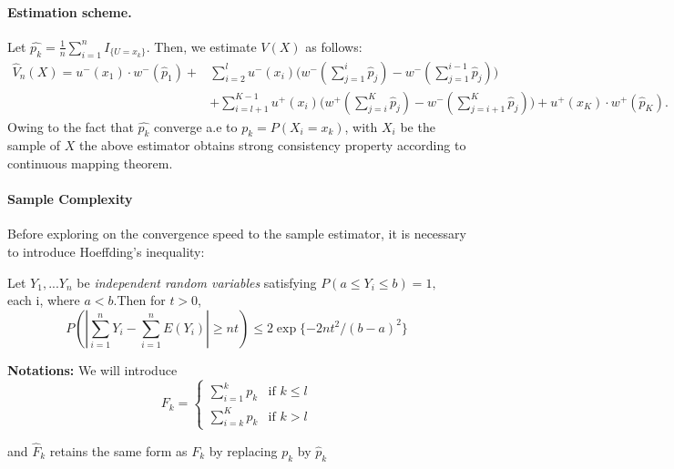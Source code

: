 \paragraph{Estimation scheme.} 
Let $\hat{p_k}= \frac{1}{n} \sum_{i=1}^n I_{\{U =x_k\}}$. Then, we estimate $V(X)$ as follows:
\begin{align}
 \label{eq:cpt-discrete-est}
\hat V_n(X) = 
u^-(x_1)\cdot w^-(\hat p_1)+
& \sum_{i=2}^l u^-(x_i) \Big(w^-(\sum_{j=1}^i \hat p_j) - w^-(\sum_{j=1}^{i-1} \hat p_j)\Big) 
\\
&
+ \sum_{i=l+1}^{K-1} u^+(x_i) \Big(w^+(\sum_{j=i}^K \hat p_j) - w^-(\sum_{j=i+1}^K \hat p_j) \Big)+ u^+(x_K)\cdot w^+(\hat p_K).
\end{align}
Owing to the fact that $\hat{p_k}$ converge a.e to $p_k=P(X_i=x_k)$, with $X_i$ be the sample of $X$ the above estimator obtains strong consistency property according to continuous mapping theorem. 

\paragraph{Sample Complexity}
Before exploring on the convergence speed to the sample estimator, it is necessary to introduce Hoeffding's inequality:
\begin{lemma}
Let $Y_1,...Y_n$ be \emph{independent random variables} satisfying $P(a\leq Y_i \leq b)= 1,$ each i, where $a<b.
$Then for $t>0$,
$$P(\left|\sum_{i=1}^n Y_i -\sum_{i=1}^n E(Y_i)\right| \geq nt ) \leq 2\exp{\{-2nt^2 /(b-a)^2\}} $$
\end{lemma}

\noindent \textbf{Notations:} We will introduce 
\[
F_k = 
\begin{cases}
   \sum_{i=1}^k p_k & \text{if   } k \leq l \\
   \sum_{i=k}^K p_k & \text{if  }  k > l
\end{cases}  
\]

and $\hat F_k$ retains the same form as $F_k$ by replacing $p_k$ by $\hat p_k$ 
\\

